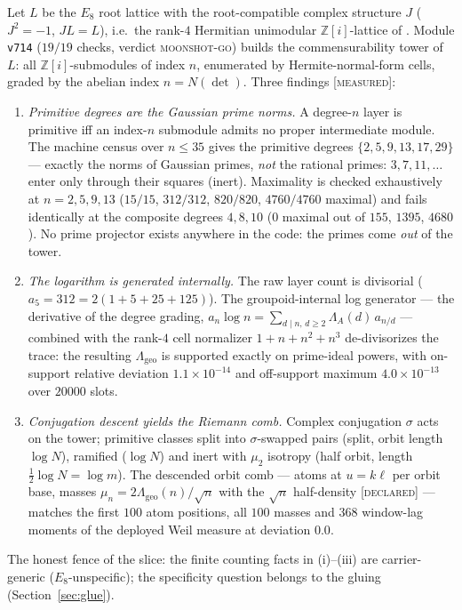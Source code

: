 \documentclass[11pt,a4paper]{article}
\theoremstyle{remark}
\newcommand{\Z}{\mathbb Z}
\newcommand{\MEASURED}{\textnormal{[\textsc{measured}]}}
\newcommand{\DECLARED}{\textnormal{[\textsc{declared}]}}
\begin{document}
Let $L$ be the $E_8$ root lattice with the root-compatible complex
structure $J$ ($J^2=-1$, $JL=L$), i.e.\ the rank-$4$ Hermitian
unimodular $\Z[i]$-lattice of \cite{TFPTnote3}.  Module \texttt{v714}
($19/19$ checks, verdict \textsc{moonshot-go}) builds the
commensurability tower of $L$: all $\Z[i]$-submodules of index $n$,
enumerated by Hermite-normal-form cells, graded by the abelian index
$n=N(\det)$.  Three findings \MEASURED:
\begin{enumerate}
\item[(i)] \emph{Primitive degrees are the Gaussian prime norms.}  A
degree-$n$ layer is primitive iff an index-$n$ submodule admits no
proper intermediate module.  The machine census over $n\le35$ gives
the primitive degrees $\{2,5,9,13,17,29\}$ --- exactly the norms of
Gaussian primes, \emph{not} the rational primes: $3,7,11,\dots$ enter
only through their squares (inert).  Maximality is checked
exhaustively at $n=2,5,9,13$ ($15/15$, $312/312$, $820/820$,
$4760/4760$ maximal) and fails identically at the composite degrees
$4,8,10$ ($0$ maximal out of $155$, $1395$, $4680$).  No prime
projector exists anywhere in the code: the primes come \emph{out} of
the tower.
\item[(ii)] \emph{The logarithm is generated internally.}  The raw
layer count is divisorial ($a_5=312=2(1+5+25+125)$).  The
groupoid-internal log generator --- the derivative of the degree
grading, $a_n\log n=\sum_{d\mid n,\,d\ge2}\Lambda_A(d)\,a_{n/d}$ ---
combined with the rank-$4$ cell normalizer $1+n+n^2+n^3$
de-divisorizes the trace: the resulting $\Lambda_{\mathrm{geo}}$ is
supported exactly on prime-ideal powers, with on-support relative
deviation $1.1\times10^{-14}$ and off-support maximum
$4.0\times10^{-13}$ over $20000$ slots.
\item[(iii)] \emph{Conjugation descent yields the Riemann comb.}
Complex conjugation $\sigma$ acts on the tower; primitive classes
split into $\sigma$-swapped pairs (split, orbit length $\log N$),
ramified ($\log N$) and inert with $\mu_2$ isotropy (half orbit,
length $\tfrac12\log N=\log m$).  The descended orbit comb --- atoms
at $u=k\ell$ per orbit base, masses
$\mu_n=2\Lambda_{\mathrm{geo}}(n)/\sqrt n$ with the $\sqrt n$
half-density \DECLARED{} --- matches the first $100$ atom positions,
all $100$ masses and $368$ window-lag moments of the deployed Weil
measure at deviation $0.0$.
\end{enumerate}
The honest fence of the slice: the finite counting facts in
(i)--(iii) are carrier-generic ($E_8$-unspecific); the specificity
question belongs to the gluing (Section~\ref{sec:glue}).
\end{document}
